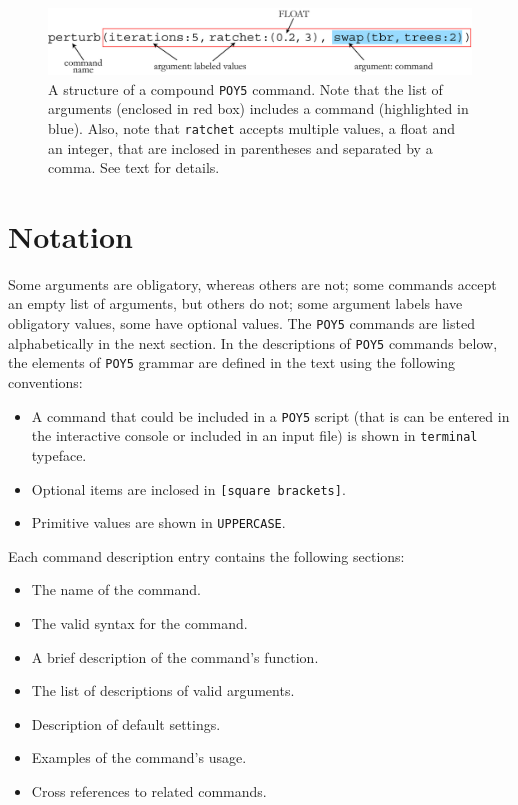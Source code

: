 \documentclass[11pt]{book}
\newcommand{\commandstyle}[1]{\texttt{#1}}
\newcommand{\poycommand}[1]{\commandstyle{#1}}
\newcommand{\poyargument}[1]{\commandstyle{#1}}
\newcommand{\poy}{\commandstyle{POY5}\xspace}
\begin{document}
\begin{figure}[htbp]
   \centering
   \includegraphics[width=1.0\textwidth]{doc/figures/fig-poycommand2.jpg}
   \caption{A structure of a compound \poy command. Note that the list of arguments
   (enclosed in red box) includes a command (highlighted in blue). Also, note that
   \poyargument{ratchet} accepts multiple values, a float and an integer, that are inclosed in
   parentheses and separated by a comma. See text for details.}
   \label{compositecommand}
\end{figure}

\section{Notation}

Some arguments are obligatory, whereas others are not; some commands accept an
empty list of arguments, but others do not; some argument labels have
obligatory values, some have optional values. The \poy commands are listed alphabetically in the next section. In the descriptions of
\poy commands below, the elements of \poy grammar are defined in
the text using the following conventions:

\begin{itemize}
    \item A command that could be included in a \poy script (that is can be entered in the
    	interactive console or included in an input file) is shown in \poycommand{terminal} typeface.
    \item Optional items are inclosed in \poycommand{[square brackets]}.
    \item Primitive values are shown in \poycommand{UPPERCASE}.
\end{itemize}

Each command description entry contains the following sections:

\begin{itemize}
    \item The name of the command.
    \item The valid syntax for the command.
    \item A brief description of the command's function.
    \item The list of descriptions of valid arguments.
    \item Description of default settings.
    \item Examples of the command's usage.
    \item Cross references to related commands. 
\end{itemize}
\end{document}
